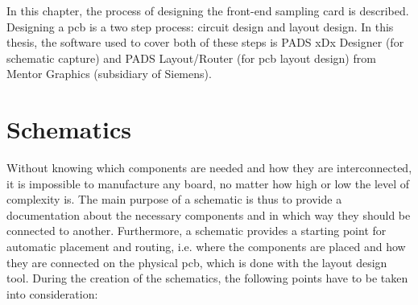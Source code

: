 In this chapter, the process of designing the front-end sampling card is described.
Designing a \gls{pcb} is a two step process: circuit design and layout design.
In this thesis, the software used to cover both of these steps is PADS xDx Designer (for schematic capture) and PADS Layout/Router (for \gls{pcb} layout design) from Mentor Graphics (subsidiary of Siemens).

\section{Schematics}
Without knowing which components are needed and how they are interconnected, it is impossible to manufacture any board, no matter how high or low the level of complexity is.
The main purpose of a schematic is thus to provide a documentation about the necessary components and in which way they should be connected to another.
Furthermore, a schematic provides a starting point for automatic placement and routing, i.e. where the components are placed and how they are connected on the physical \gls{pcb}, which is done with the layout design tool.
During the creation of the schematics, the following points have to be taken into consideration:

